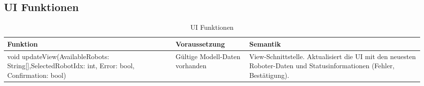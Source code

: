 \subsection{UI Funktionen}
\begin{table}[h!]
    \centering
    \begin{tabular}{|p{5cm}|p{5cm}|p{5cm}|}
        \hline
        \textbf{Funktion} & \textbf{Voraussetzung} & \textbf{Semantik} \\
        \hline
        void updateView(AvailableRobots: String[],SelectedRobotIdx: int, Error: bool, Confirmation: bool) & Gültige Modell-Daten vorhanden & View-Schnittstelle. Aktualisiert die UI mit den neuesten Roboter-Daten und Statusinformationen (Fehler, Bestätigung). \\ 
        \hline
    \end{tabular}
    \caption{UI Funktionen}
    \label{tab:UIFunktionen}
\end{table}
\clearpage

